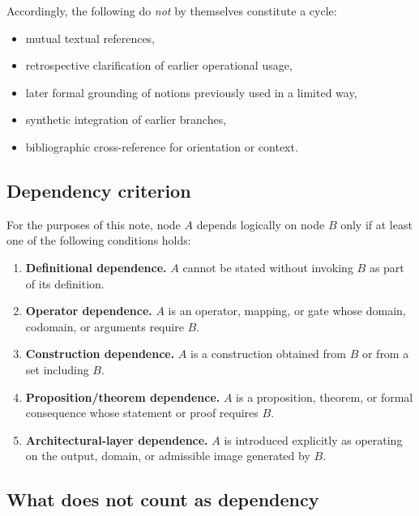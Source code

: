 \documentclass[11pt,a4paper]{article}
\begin{document}
	Accordingly, the following do \emph{not} by themselves constitute a cycle:
	\begin{itemize}[leftmargin=2em]
		\item mutual textual references,
		\item retrospective clarification of earlier operational usage,
		\item later formal grounding of notions previously used in a limited way,
		\item synthetic integration of earlier branches,
		\item bibliographic cross-reference for orientation or context.
	\end{itemize}
	
	\subsection{Dependency criterion}
	
	For the purposes of this note, node $A$ depends logically on node $B$ only if at least one of
	the following conditions holds:
	
	\begin{enumerate}[leftmargin=2em]
		\item \textbf{Definitional dependence.}  
		$A$ cannot be stated without invoking $B$ as part of its definition.
		
		\item \textbf{Operator dependence.}  
		$A$ is an operator, mapping, or gate whose domain, codomain, or arguments require $B$.
		
		\item \textbf{Construction dependence.}  
		$A$ is a construction obtained from $B$ or from a set including $B$.
		
		\item \textbf{Proposition/theorem dependence.}  
		$A$ is a proposition, theorem, or formal consequence whose statement or proof requires $B$.
		
		\item \textbf{Architectural-layer dependence.}  
		$A$ is introduced explicitly as operating on the output, domain, or admissible image generated by $B$.
	\end{enumerate}
	
	\subsection{What does not count as dependency}
	
\end{document}
